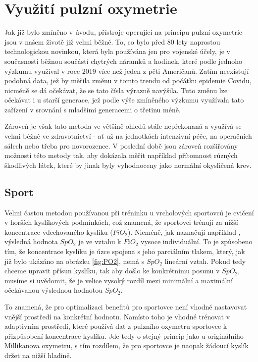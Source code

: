 \section {Využití pulzní oxymetrie}
Jak již bylo zmíněno v úvodu, přístroje operující na principu pulzní oxymetrie jsou v našem životě již velmi běžné. To, co bylo před 80 lety naprostou technologickou novinkou, která byla používána jen pro vojenské účely, je v současnosti běžnou součástí chytrých náramků a hodinek, které podle jednoho výzkumu \citep{wearables} využíval v roce 2019 více než jeden z pěti Američanů. Zatím neexistují podobná data, jež by měřila změnu v tomto trendu od počátku epidemie Covidu, nicméně se dá očekávat, že se tato čísla výrazně navýšila. Tuto změnu lze očekávat i u starší generace, jež podle výše zmíněného výzkumu využívala tato zařízení v srovnání s mladšími generacemi o třetinu méně.
\par Zároveň je však tato metoda ve většině ohledů stále nepřekonaná a využívá se velmi běžně ve zdravotnictví - ať už na jednotkách intenzivní péče, na operačních sálech nebo třeba pro novorozence. V poslední době jsou zároveň rozšiřovány možnosti této metody tak, aby dokázala měřit například přítomnost různých škodlivých látek, které by jinak byly vyhodnoceny jako normální okysličená krev. \citep{MetACarboxy}
\subsection {Sport}
Velmi častou metodou používanou při tréninku u vrcholových sportovců je cvičení v horších kyslíkových podmínkách, což znamená, že sportovci trénují za nižší koncentrace vdechovaného kyslíku ($FiO_2$). Nicméně, jak naznačují například \cite{fio2}, výsledná hodnota $SpO_2$ je ve vztahu k $FiO_2$ vysoce individuální. To je způsobeno tím, že koncentrace kyslíku je úzce spojena s jeho parciálním tlakem, který, jak již bylo ukázáno na obrázku \ref{fig:PO2}, nemá s $SpO_2$ lineární vztah. Pokud tedy chceme upravit přísun kyslíku, tak aby došlo ke konkrétnímu posunu v $SpO_2$, musíme si uvědomit, že je velice vysoký rozdíl mezi minimální a maximální očekávanou výslednou hodnotou $SpO_2$. 
\par To znamená, že pro optimalizaci benefitů pro sportovce není vhodné nastavovat vnější prostředí na konkrétní hodnotu. Namísto toho je vhodné trénovat v adaptivním prostředí, které používá dat z pulzního oxymetru sportovce k přizpůsobení koncentrace kyslíku. Jde tedy o stejný princip jako u originálního Millikanova oxymetru, s tím rozdílem, že pro sportovce je naopak žádoucí kyslík držet na nižší hladině. \citep{sportuse}
